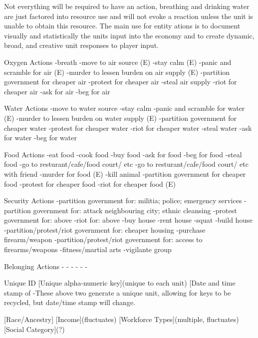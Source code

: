Not everything will be required to have an action, breathing and drinking water are just factored into resource use and will not evoke a reaction unless the unit is unable to obtain this resource. The main use for entity ations is to document visually and statistically the units input into the economy and to create dynamic, broad, and creative unit responses to player input.

Oxygen Actions
-breath 
-move to air source (E)
-stay calm (E)
-panic and scramble for air (E)
-murder to lessen burden on air supply (E)
-partition government for cheaper air
-protest for cheaper air
-steal air supply
-riot for cheaper air
-ask for air
-beg for air

Water Actions
-move to water source
-stay calm
-panic and scramble for water (E)
-murder to lessen burden on water supply (E)
-partition government for cheaper water
-protest for cheaper water
-riot for cheaper water
-steal water
-ask for water
-beg for water


Food Actions
-eat food
-cook food
-buy food
-ask for food
-beg for food
-steal food 
-go to resturant/cafe/food court/ etc
-go to resturant/cafe/food court/ etc with friend
-murder for food (E)
-kill animal
-partition government for cheaper food
-protest for cheaper food
-riot for cheaper food (E)


Security Actions
-partition government for: militia; police; emergency services
-partition government for: attack neighbouring city; ethnic cleansing
-protest government for: above
-riot for: above
-buy house
-rent house
-squat
-build house
-partition/protest/riot government for: cheaper housing
-purchase firearm/weapon
-partition/protest/riot government for: access to firearms/weapons
-fitness/martial arts
-vigilante group


Belonging Actions
-
-
-
-
-
-








Unique ID
[Unique alpha-numeric key](unique to each unit)
[Date and time stamp of %
-These above two generate a unique unit, allowing for keys to be recycled, but date/time stamp will change.

[Race/Ancestry]
[Income](fluctuates)
[Workforce Types](multiple, fluctuates)
[Social Category](?)

